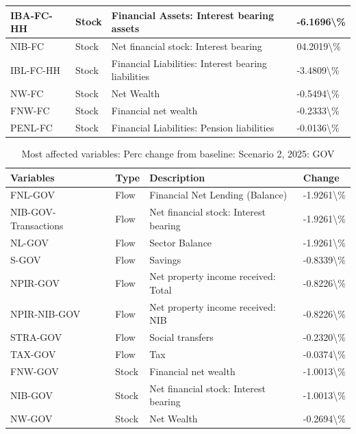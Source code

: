 \documentclass[
]{book}
\begin{document}
\begin{table}
\begin{tabular}[t]{l|l|l|l}
\hline
IBA-FC-HH & Stock & Financial Assets: Interest bearing assets & -6.1696\textbackslash{}\%\\
\hline
NIB-FC & Stock & Net financial stock: Interest bearing & 04.2019\textbackslash{}\%\\
\hline
IBL-FC-HH & Stock & Financial Liabilities: Interest bearing liabilities & -3.4809\textbackslash{}\%\\
\hline
NW-FC & Stock & Net Wealth & -0.5494\textbackslash{}\%\\
\hline
FNW-FC & Stock & Financial net wealth & -0.2333\textbackslash{}\%\\
\hline
PENL-FC & Stock & Financial Liabilities: Pension liabilities & -0.0136\textbackslash{}\%\\
\hline
\end{tabular}
\end{table}

\begin{table}

\caption{\label{tab:most-affected-scenario-2-perc-2025-GOV}Most affected variables: Perc change from baseline: Scenario 2, 2025: GOV}
\centering
\fontsize{10}{12}\selectfont
\begin{tabular}[t]{l|l|l|l}
\hline
Variables & Type & Description & Change\\
\hline
FNL-GOV & Flow & Financial Net Lending (Balance) & -1.9261\textbackslash{}\%\\
\hline
NIB-GOV-Transactions & Flow & Net financial stock: Interest bearing & -1.9261\textbackslash{}\%\\
\hline
NL-GOV & Flow & Sector Balance & -1.9261\textbackslash{}\%\\
\hline
S-GOV & Flow & Savings & -0.8339\textbackslash{}\%\\
\hline
NPIR-GOV & Flow & Net property income received: Total & -0.8226\textbackslash{}\%\\
\hline
NPIR-NIB-GOV & Flow & Net property income received: NIB & -0.8226\textbackslash{}\%\\
\hline
STRA-GOV & Flow & Social transfers & -0.2320\textbackslash{}\%\\
\hline
TAX-GOV & Flow & Tax & -0.0374\textbackslash{}\%\\
\hline
FNW-GOV & Stock & Financial net wealth & -1.0013\textbackslash{}\%\\
\hline
NIB-GOV & Stock & Net financial stock: Interest bearing & -1.0013\textbackslash{}\%\\
\hline
NW-GOV & Stock & Net Wealth & -0.2694\textbackslash{}\%\\
\hline
\end{tabular}
\end{table}
\end{document}
